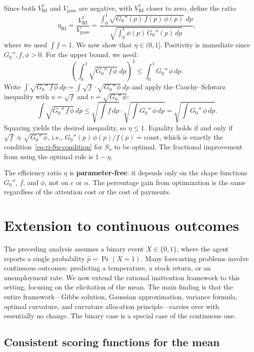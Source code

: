 \documentclass[11pt]{article}
\begin{document}
Since both $V^*_{\mathrm{RI}}$ and $V_{\mathrm{pass}}$ are negative, with $V^*_{\mathrm{RI}}$ closer to zero, define the ratio
\begin{equation}\label{eq:ri-efficiency}
\eta_{\mathrm{RI}} = \frac{V^*_{\mathrm{RI}}}{V_{\mathrm{pass}}} = \frac{\displaystyle\int_0^1 \sqrt{G_0''(p)\,f(p)\,\phi(p)}\;dp}{\displaystyle\sqrt{\int_0^1 \phi(p)\,G_0''(p)\,dp}},
\end{equation}
where we used $\int f = 1$. We now show that $\eta \in (0,1]$. Positivity is immediate since $G_0'', f, \phi > 0$. For the upper bound, we need:
\[
\left(\int_0^1 \sqrt{G_0''\,f\,\phi}\;dp\right)^2 \leq \int_0^1 G_0''\,\phi\,dp.
\]
Write $\int \sqrt{G_0''\,f\,\phi}\,dp = \int \sqrt{f} \cdot \sqrt{G_0''\,\phi}\,dp$ and apply the Cauchy--Schwarz inequality with $u = \sqrt{f}$ and $v = \sqrt{G_0''\,\phi}$:
\[
\int \sqrt{G_0''\,f\,\phi}\,dp \leq \sqrt{\int f\,dp} \cdot \sqrt{\int G_0''\,\phi\,dp} = \sqrt{\int G_0''\,\phi\,dp}.
\]
Squaring yields the desired inequality, so $\eta \leq 1$. Equality holds if and only if $\sqrt{f} \propto \sqrt{G_0''\,\phi}$, i.e., $G_0''(p)\,\phi(p)/f(p) = \text{const}$, which is exactly the condition~\eqref{eq:ri-Su-condition} for $S_u$ to be optimal. The fractional improvement from using the optimal rule is $1 - \eta$.

The efficiency ratio $\eta$ is \textbf{parameter-free}: it depends only on the shape functions $G_0''$, $f$, and $\phi$, not on $c$ or $\alpha$. The percentage gain from optimization is the same regardless of the attention cost or the cost of payments.


\section{Extension to continuous outcomes}\label{sec:continuous}

The preceding analysis assumes a binary event $X \in \{0,1\}$, where the agent reports a single probability $\hat{p} = \Pr(X=1)$. Many forecasting problems involve continuous outcomes: predicting a temperature, a stock return, or an unemployment rate. We now extend the rational inattention framework to this setting, focusing on the elicitation of the mean. The main finding is that the entire framework---Gibbs solution, Gaussian approximation, variance formula, optimal curvature, and curvature allocation principle---carries over with essentially no change. The binary case is a special case of the continuous one.

\subsection{Consistent scoring functions for the mean}\label{sec:mean-scoring}
\end{document}
